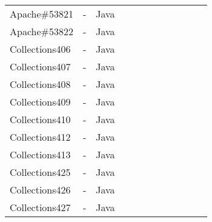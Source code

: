 \begin{table}[h!]
\begin{tabular}{lccccccccccc}
    Apache\#53821     &  -  & Java  &  &              &    &                                 &                   &                           &                    &&           \\
    Apache\#53822     &  -  & Java  &  &              &    &                                 &                   &                           &                    &&            \\
    \midrule
    Collections406    &  -  & Java  &  &              &    &                                 &                   &                           &                    &&           \\
    Collections407    &  -  & Java  &  &              &    &                                 &                   &                           &                    &&          \\
    Collections408    &  -  & Java  &  &              &    &                                 &                   &                           &                    &&            \\
    Collections409    &  -  & Java  &  &              &    &                                 &                   &                           &                    &&            \\
    Collections410    &  - & Java  &  &              &    &                                 &                   &                           &                     &&           \\
    Collections412    &  -  & Java  &  &              &    &                                 &                   &                           &                    &&            \\
    Collections413    &  -  & Java  &  &              &    &                                 &                   &                           &                    &&            \\
    Collections425    &  -  & Java  &  &              &    &                                 &                   &                           &                    &&            \\
    Collections426    &  -  & Java  &  &              &    &                                 &                   &                           &                    &&            \\
    Collections427    &   - & Java  &  &              &    &                                 &                   &                           &                    &&            \\

\end{tabular}
\end{table}
